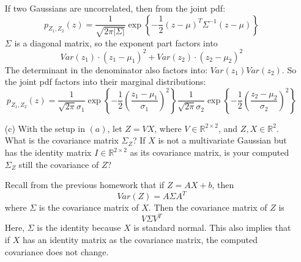 \documentclass{article}
\begin{document}
\begin{itemize}
\begin{answer}
                If two Gaussians are uncorrelated, then from the joint pdf:
                    \begin{equation*}
                        p_{Z_{1}, Z_{2}}(z) = \dfrac{1}{\sqrt{2\pi\lvert \Sigma \rvert}}\exp\left\{-\dfrac{1}{2}(z - \mu)^{T}\Sigma^{-1}(z - \mu)\right\}
                    \end{equation*}
                $\Sigma$ is a diagonal matrix, so the exponent part factors into
                    \begin{equation*}
                        Var(z_{1}) \cdot (z_{1} - \mu_{1})^{2} + Var(z_{2}) \cdot (z_{2} - \mu_{2})^{2}
                    \end{equation*}
                The determinant in the denominator also factors into: $Var(z_{1})Var(z_{2})$. So the joint pdf factors into their marginal distributions:
                    \begin{equation*}
                        p_{Z_{1}, Z_{2}}(z) = \dfrac{1}{\sqrt{2\pi}\sigma_{1}} \exp\left\{-\dfrac{1}{2}\left(\dfrac{z_{1} - \mu_{1}}{\sigma_{1}}\right)^{2}\right\}\dfrac{1}{\sqrt{2\pi}\sigma_{2}} \exp\left\{-\dfrac{1}{2}\left(\dfrac{z_{2} - \mu_{2}}{\sigma_{2}}\right)^{2}\right\}
                    \end{equation*}
            \end{answer}

        \item [(c)] With the setup in $(a)$, let $Z = VX$, where $V \in \mathbb{R}^{2 \times 2}$, and $Z, X \in \mathbb{R}^{2}$. What is the covariance matrix $\Sigma_{Z}$? If $X$ is not a multivariate Gaussian but has the identity matrix $I \in \mathbb{R}^{2 \times 2}$ as its covariance matrix, is your computed $\Sigma_{Z}$ still the covariance of $Z$?
            \begin{answer}
                Recall from the previous homework that if $Z = AX + b$, then 
                    \begin{equation*}
                        Var(Z) = A \Sigma A^{T}
                    \end{equation*}
                where $\Sigma$ is the covariance matrix of $X$. Then the covariance matrix of $Z$ is 
                    \begin{equation*}
                        V \Sigma V^{T}
                    \end{equation*}
                Here, $\Sigma$ is the identity because $X$ is standard normal. This also implies that if $X$ has an identity matrix as the covariance matrix, the computed covariance does not change.
            \end{answer}


\end{itemize}
\end{document}
